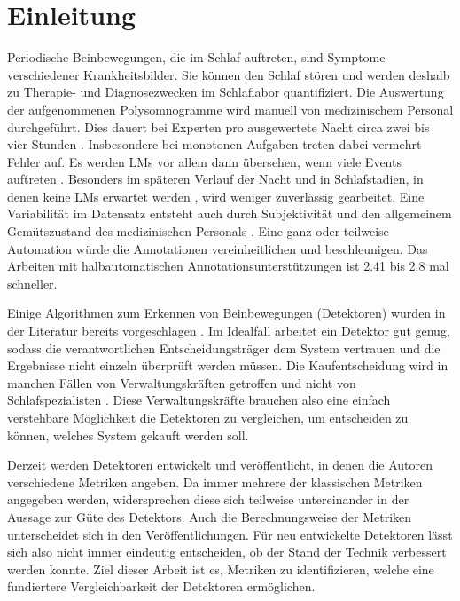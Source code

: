 \chapter{Einleitung}\label{chap:Einleitung}
Periodische Beinbewegungen, die im Schlaf auftreten, sind Symptome verschiedener Krankheitsbilder. Sie können den Schlaf stören und werden deshalb zu Therapie- und Diagnosezwecken im Schlaflabor quantifiziert. Die Auswertung der aufgenommenen Polysomnogramme wird manuell von medizinischem Personal durchgeführt. 
Dies dauert bei Experten pro ausgewertete Nacht circa zwei bis vier Stunden \cite{Huang}. Insbesondere bei monotonen Aufgaben treten dabei vermehrt Fehler auf. Es werden \glspl{LM} vor allem dann übersehen, wenn viele Events auftreten \cite{worldsleepcongress}. Besonders im späteren Verlauf der Nacht und in Schlafstadien, in denen keine \glspl{LM} erwartet werden \cite{Huang}, wird weniger zuverlässig gearbeitet. Eine Variabilität im Datensatz entsteht auch durch Subjektivität und den allgemeinem Gemütszustand des medizinischen Personals \cite{worldsleepcongress}. Eine ganz oder teilweise Automation würde die Annotationen vereinheitlichen und beschleunigen. Das Arbeiten mit halbautomatischen Annotationsunterstützungen ist 2.41 \cite{interscorer} bis 2.8 \cite{Roessen} mal schneller. 

Einige Algorithmen zum Erkennen von Beinbewegungen (Detektoren) wurden in der Literatur bereits vorgeschlagen \cite{Huang,Moore,Carvelli}. Im Idealfall arbeitet ein Detektor gut genug, sodass die verantwortlichen Entscheidungsträger dem System vertrauen und die Ergebnisse nicht einzeln überprüft werden müssen. Die Kaufentscheidung wird in manchen Fällen von Verwaltungskräften getroffen und nicht von Schlafspezialisten \cite{SleepDisordersMedicine}. Diese Verwaltungskräfte brauchen also eine einfach verstehbare Möglichkeit die Detektoren zu vergleichen, um entscheiden zu können, welches System gekauft werden soll. 

Derzeit werden Detektoren entwickelt und veröffentlicht, in denen die Autoren verschiedene Metriken angeben. Da immer mehrere der klassischen Metriken angegeben werden, widersprechen diese sich teilweise untereinander in der Aussage zur Güte des Detektors. Auch die Berechnungsweise der Metriken unterscheidet sich in den Veröffentlichungen. Für neu entwickelte Detektoren lässt sich also nicht immer eindeutig entscheiden, ob der Stand der Technik verbessert werden konnte.
Ziel dieser Arbeit ist es, Metriken zu identifizieren, welche eine fundiertere Vergleichbarkeit der Detektoren ermöglichen. 

